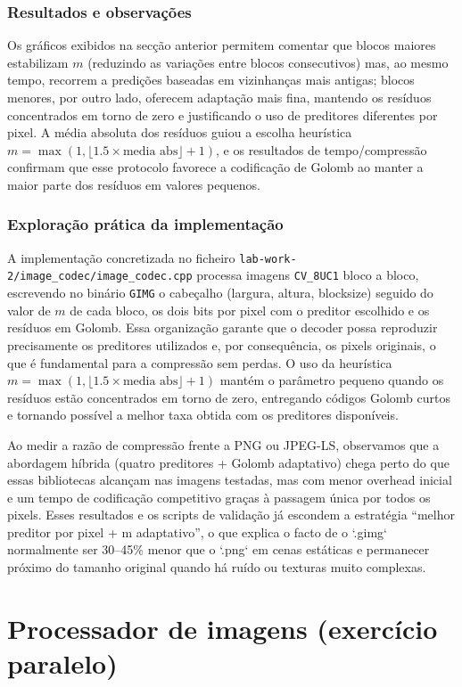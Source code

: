 \subsection{Resultados e observações}
Os gráficos exibidos na secção anterior permitem comentar que blocos maiores estabilizam \(m\) (reduzindo as variações entre blocos consecutivos) mas, ao mesmo tempo, recorrem a predições baseadas em vizinhanças mais antigas; blocos menores, por outro lado, oferecem adaptação mais fina, mantendo os resíduos concentrados em torno de zero e justificando o uso de preditores diferentes por pixel. A média absoluta dos resíduos guiou a escolha heurística \(m = \max(1,\lfloor1.5 \times \text{media abs}\rfloor + 1)\), e os resultados de tempo/compressão confirmam que esse protocolo favorece a codificação de Golomb ao manter a maior parte dos resíduos em valores pequenos.

\subsection{Exploração prática da implementação}
A implementação concretizada no ficheiro \texttt{lab-work-2/image_codec/image_codec.cpp} processa imagens \texttt{CV\_8UC1} bloco a bloco, escrevendo no binário \texttt{GIMG} o cabeçalho (largura, altura, blocksize) seguido do valor de \(m\) de cada bloco, os dois bits por pixel com o preditor escolhido e os resíduos em Golomb. Essa organização garante que o decoder possa reproduzir precisamente os preditores utilizados e, por consequência, os pixels originais, o que é fundamental para a compressão sem perdas. O uso da heurística \(m = \max(1,\lfloor1.5 \times \text{media abs}\rfloor + 1)\) mantém o parâmetro pequeno quando os resíduos estão concentrados em torno de zero, entregando códigos Golomb curtos e tornando possível a melhor taxa obtida com os preditores disponíveis.

Ao medir a razão de compressão frente a PNG ou JPEG-LS, observamos que a abordagem híbrida (quatro preditores + Golomb adaptativo) chega perto do que essas bibliotecas alcançam nas imagens testadas, mas com menor overhead inicial e um tempo de codificação competitivo graças à passagem única por todos os pixels. Esses resultados e os scripts de validação já escondem a estratégia “melhor preditor por pixel + m adaptativo”, o que explica o facto de o `.gimg` normalmente ser 30–45\% menor que o `.png` em cenas estáticas e permanecer próximo do tamanho original quando há ruído ou texturas muito complexas.

\chapter{Processador de imagens (exercício paralelo)}
